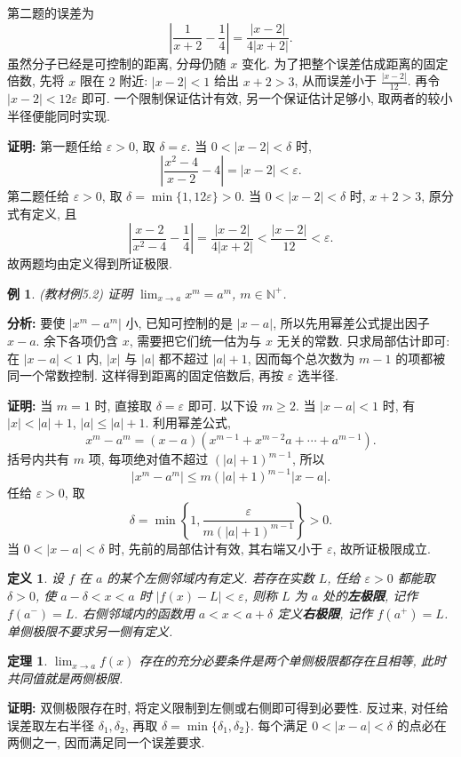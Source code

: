\documentclass[UTF8,openany]{ctexbook}
\theoremstyle{chinesetextbook}
\newtheorem{definition}{定义}[section]
\newtheorem{example}{例}[section]
\newtheorem{theorem}{定理}[section]
\newenvironment{cnproof}{\par\indent\textbf{证明:} \ignorespaces}{\par}
\begin{document}
第二题的误差为
\[
\left|\frac1{x+2}-\frac14\right|=\frac{|x-2|}{4|x+2|}.
\]
虽然分子已经是可控制的距离, 分母仍随 $x$ 变化. 为了把整个误差估成距离的固定倍数, 先将 $x$ 限在 $2$ 附近: $|x-2|<1$ 给出 $x+2>3$, 从而误差小于 $\displaystyle\frac{|x-2|}{12}$. 再令 $|x-2|<12\varepsilon$ 即可. 一个限制保证估计有效, 另一个保证估计足够小, 取两者的较小半径便能同时实现.
\begin{cnproof}
第一题任给 $\varepsilon>0$, 取 $\delta=\varepsilon$. 当 $0<|x-2|<\delta$ 时,
\[
\left|\frac{x^2-4}{x-2}-4\right|=|x-2|<\varepsilon.
\]
第二题任给 $\varepsilon>0$, 取 $\delta=\min\{1,12\varepsilon\}>0$. 当 $0<|x-2|<\delta$ 时, $x+2>3$, 原分式有定义, 且
\[
\left|\frac{x-2}{x^2-4}-\frac14\right|
=\frac{|x-2|}{4|x+2|}<\frac{|x-2|}{12}<\varepsilon.
\]
故两题均由定义得到所证极限.
\end{cnproof}
\begin{example}
(教材例5.2) 证明 $\displaystyle \lim_{x\to a}x^m=a^m$, $m\in\mathbb N^+$.
\end{example}
\par\indent\textbf{分析:} 要使 $|x^m-a^m|$ 小, 已知可控制的是 $|x-a|$, 所以先用幂差公式提出因子 $x-a$. 余下各项仍含 $x$, 需要把它们统一估为与 $x$ 无关的常数. 只求局部估计即可: 在 $|x-a|<1$ 内, $|x|$ 与 $|a|$ 都不超过 $|a|+1$, 因而每个总次数为 $m-1$ 的项都被同一个常数控制. 这样得到距离的固定倍数后, 再按 $\varepsilon$ 选半径.
\begin{cnproof}
当 $m=1$ 时, 直接取 $\delta=\varepsilon$ 即可. 以下设 $m\ge2$. 当 $|x-a|<1$ 时, 有 $|x|<|a|+1$, $|a|\le|a|+1$. 利用幂差公式,
\[
x^m-a^m=(x-a)(x^{m-1}+x^{m-2}a+\cdots+a^{m-1}).
\]
括号内共有 $m$ 项, 每项绝对值不超过 $(|a|+1)^{m-1}$, 所以
\[
|x^m-a^m|\le m(|a|+1)^{m-1}|x-a|.
\]
任给 $\varepsilon>0$, 取
\[
\delta=\min\left\{1,\frac\varepsilon{m(|a|+1)^{m-1}}\right\}>0.
\]
当 $0<|x-a|<\delta$ 时, 先前的局部估计有效, 其右端又小于 $\varepsilon$, 故所证极限成立.
\end{cnproof}
\begin{definition}
设 $f$ 在 $a$ 的某个左侧邻域内有定义. 若存在实数 $L$, 任给 $\varepsilon>0$ 都能取 $\delta>0$, 使 $a-\delta<x<a$ 时 $|f(x)-L|<\varepsilon$, 则称 $L$ 为 $a$ 处的\textbf{左极限}, 记作 $f(a^-)=L$. 右侧邻域内的函数用 $a<x<a+\delta$ 定义\textbf{右极限}, 记作 $f(a^+)=L$. 单侧极限不要求另一侧有定义.
\end{definition}
\begin{theorem}
$\displaystyle \lim_{x\to a}f(x)$ 存在的充分必要条件是两个单侧极限都存在且相等, 此时共同值就是两侧极限.
\end{theorem}
\begin{cnproof}
双侧极限存在时, 将定义限制到左侧或右侧即可得到必要性. 反过来, 对任给误差取左右半径 $\delta_1,\delta_2$, 再取 $\delta=\min\{\delta_1,\delta_2\}$. 每个满足 $0<|x-a|<\delta$ 的点必在两侧之一, 因而满足同一个误差要求.
\end{cnproof}
\end{document}
